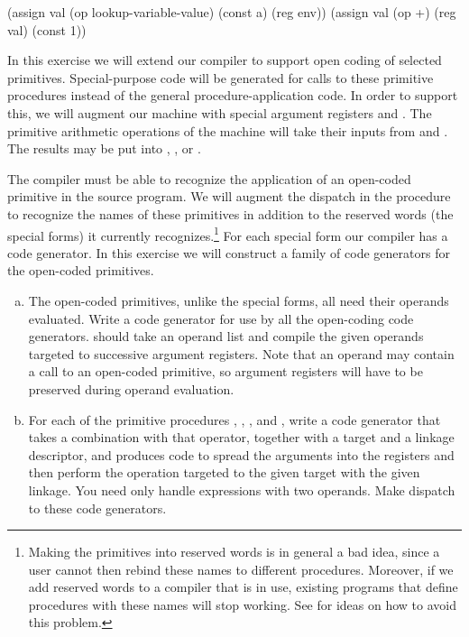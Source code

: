 \begin{exerciseGroup}
\begin{codeBlock}
(assign
 val (op lookup-variable-value) (const a) (reg env))
(assign val (op +) (reg val) (const 1))
\end{codeBlock}

In this exercise we will extend our compiler to support open coding of selected
primitives.  Special-purpose code will be generated for calls to these
primitive procedures instead of the general procedure-application code.  In
order to support this, we will augment our machine with special argument
registers  and .  The primitive arithmetic operations of
the machine will take their inputs from  and . The
results may be put into , , or .

The compiler must be able to recognize the application of an open-coded
primitive in the source program.  We will augment the dispatch in the
 procedure to recognize the names of these primitives in addition
to the reserved words (the special forms) it currently
recognizes.\footnote{Making the primitives into reserved words is in general a
bad idea, since a user cannot then rebind these names to different procedures.
Moreover, if we add reserved words to a compiler that is in use, existing
programs that define procedures with these names will stop working.  See
 for ideas on how to avoid this problem.} For each special
form our compiler has a code generator.  In this exercise we will construct a
family of code generators for the open-coded primitives.

\begin{enumerate}[a.]

\item
The open-coded primitives, unlike the special forms, all need their operands
evaluated.  Write a code generator  for use by all the
open-coding code generators.   should take an operand
list and compile the given operands targeted to successive argument registers.
Note that an operand may contain a call to an open-coded primitive, so argument
registers will have to be preserved during operand evaluation.

\item
For each of the primitive procedures \code{=}, \code{*}, \code{-}, and
\code{+}, write a code generator that takes a combination with that operator,
together with a target and a linkage descriptor, and produces code to spread
the arguments into the registers and then perform the operation targeted to the
given target with the given linkage.  You need only handle expressions with two
operands.  Make  dispatch to these code generators.


\end{enumerate}
\end{exerciseGroup}
